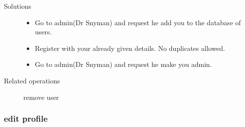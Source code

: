 \documentclass[14pt, a4paper]{article}
\begin{document}
\begin{description}
\begin{itemize}
	\end{itemize}
\item[Solutions]\hfill
	\begin{itemize}
	\item Go to admin(Dr Snyman) and request he add you to the database of users.
	\item Register with your already given details. No duplicates allowed.
	\item  Go to admin(Dr Snyman) and request he make you admin.
	\end{itemize}
\item[Related operations] remove user
\end{description}
	  
\subsubsection{edit profile}
\end{document}
